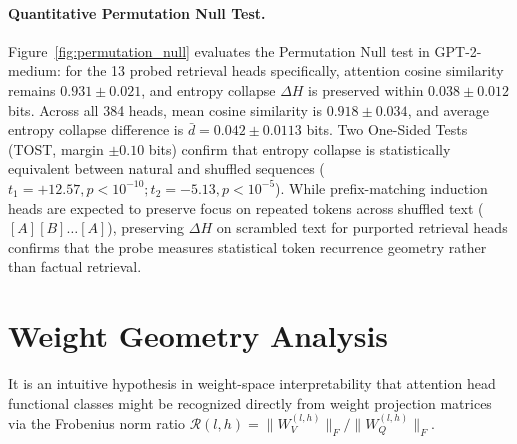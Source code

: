 \documentclass[11pt]{article}
\begin{document}
\paragraph{Quantitative Permutation Null Test.}
Figure~\ref{fig:permutation_null} evaluates the Permutation Null test in GPT-2-medium: for the 13 probed retrieval heads specifically, attention cosine similarity remains $0.931 \pm 0.021$, and entropy collapse $\Delta H$ is preserved within $0.038 \pm 0.012$ bits. Across all 384 heads, mean cosine similarity is $0.918 \pm 0.034$, and average entropy collapse difference is $\bar{d} = 0.042 \pm 0.0113$ bits. Two One-Sided Tests (TOST, margin $\pm 0.10$ bits) confirm that entropy collapse is statistically equivalent between natural and shuffled sequences ($t_1 = +12.57, p < 10^{-10}; t_2 = -5.13, p < 10^{-5}$). While prefix-matching induction heads are expected to preserve focus on repeated tokens across shuffled text ($[A][B]\dots[A]$), preserving $\Delta H$ on scrambled text for purported retrieval heads confirms that the probe measures statistical token recurrence geometry rather than factual retrieval.

\section{Weight Geometry Analysis}
\label{sec:geometry}

It is an intuitive hypothesis in weight-space interpretability that attention head functional classes might be recognized directly from weight projection matrices via the Frobenius norm ratio $\mathcal{R}(l, h) = \|W_V^{(l, h)}\|_F / \|W_Q^{(l, h)}\|_F$.

\begin{table}[t]
\centering
\small
{}
\caption{Weight geometry correlation analysis across architectures. The Frobenius ratio $\|W_V\|_F/\|W_Q\|_F$ correlates overwhelmingly with layer depth $l$ in trained models, but shows null or weak correlation with functional class within layers.}
\label{tab:geometry}
\end{table}
\end{document}
